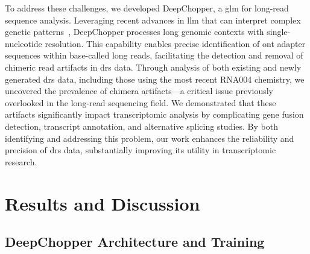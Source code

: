 \documentclass[pdflatex,sn-nature, lineno]{sn-jnl}%
\begin{document}
To address these challenges, we developed DeepChopper, a \gls{glm} for long-read sequence analysis.
Leveraging recent advances in \gls{llm} that can interpret complex genetic patterns~\cite{benegas2024genomic}, DeepChopper processes long genomic contexts with single-nucleotide resolution.
This capability enables precise identification of \gls{ont} adapter sequences within base-called long reads, facilitating the detection and removal of chimeric read artifacts in \gls{drs} data.
Through analysis of both existing and newly generated \gls{drs} data, including those using the most recent RNA004 chemistry, we uncovered the prevalence of chimera artifacts—a critical issue previously overlooked in the long-read sequencing field.
We demonstrated that these artifacts significantly impact transcriptomic analysis by complicating gene fusion detection, transcript annotation, and alternative splicing studies.
By both identifying and addressing this problem, our work enhances the reliability and precision of \gls{drs} data, substantially improving its utility in transcriptomic research.

\section{Results and Discussion}

\subsection{DeepChopper Architecture and Training}\label{subsec:deepchopper_architecture}
\end{document}
